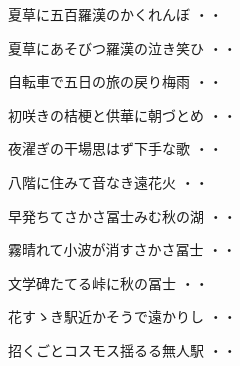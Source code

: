 \vspace{0.6cm}
\begin{shiika}夏草に五百羅漢のかくれんぼ
\hfill{・・}\end{shiika}
\vspace{0.6cm}
\begin{shiika}夏草にあそびつ羅漢の泣き笑ひ
\hfill{・・}\end{shiika}
\vspace{0.6cm}
\begin{shiika}自転車で五日の旅の戻り梅雨
\hfill{・・}\end{shiika}
\vspace{0.6cm}
\begin{shiika}初咲きの桔梗と供華に朝づとめ
\hfill{・・}\end{shiika}
\vspace{0.6cm}
\begin{shiika}夜濯ぎの干場思はず下手な歌
\hfill{・・}\end{shiika}
\vspace{0.6cm}
\begin{shiika}八階に住みて音なき遠花火
\hfill{・・}\end{shiika}
\vspace{0.6cm}
\begin{shiika}早発ちてさかさ冨士みむ秋の湖
\hfill{・・}\end{shiika}
\vspace{0.6cm}
\begin{shiika}霧晴れて小波が消すさかさ冨士
\hfill{・・}\end{shiika}
\vspace{0.6cm}
\begin{shiika}文学碑たてる峠に秋の冨士
\hfill{・・}\end{shiika}
\vspace{0.6cm}
\begin{shiika}花すゝき駅近かそうで遠かりし
\hfill{・・}\end{shiika}
\vspace{0.6cm}
\begin{shiika}招くごとコスモス揺るる無人駅
\hfill{・・}\end{shiika}
